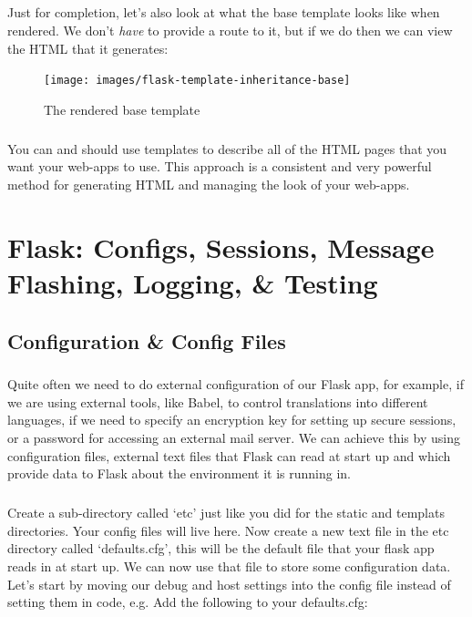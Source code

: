 \documentclass[12pt, a4paper, oneside]{book}
\begin{document}
{\paragraph{} Just for completion, let's also look at what the base template looks like when rendered. We don't \emph{have} to provide a route to it, but if we do then we can view the HTML that it generates:

\begin{figure}[H]
\centering
\texttt{[image: images/flask-template-inheritance-base]}
\caption{The rendered base template}
\label{fig:flask-template-inheritance-base}
\end{figure}

\paragraph{} You can and should use templates to describe all of the HTML pages that you want your web-apps to use. This approach is a consistent and very powerful method for generating HTML and managing the look of your web-apps.


\chapter{Flask: Configs, Sessions, Message Flashing, Logging, \& Testing}
\label{lab06}
\paragraph{} 

\section{Configuration \& Config Files}
\label{configs}
\paragraph{} Quite often we need to do external configuration of our Flask app, for example, if we are using external tools, like Babel, to control translations into different languages, if we need to specify an encryption key for setting up secure sessions, or a password for accessing an external mail server. We can achieve this by using configuration files, external text files that Flask can read at start up and which provide data to Flask about the environment it is running in.

\paragraph{} Create a sub-directory called `etc' just like you did for the static and templats directories. Your config files will live here. Now create a new text file in the etc directory called `defaults.cfg', this will be the default file that your flask app reads in at start up. We can now use that file to store some configuration data. Let's start by moving our debug and host settings into the config file instead of setting them in code, e.g. Add the following to your defaults.cfg:

}
\end{document}
